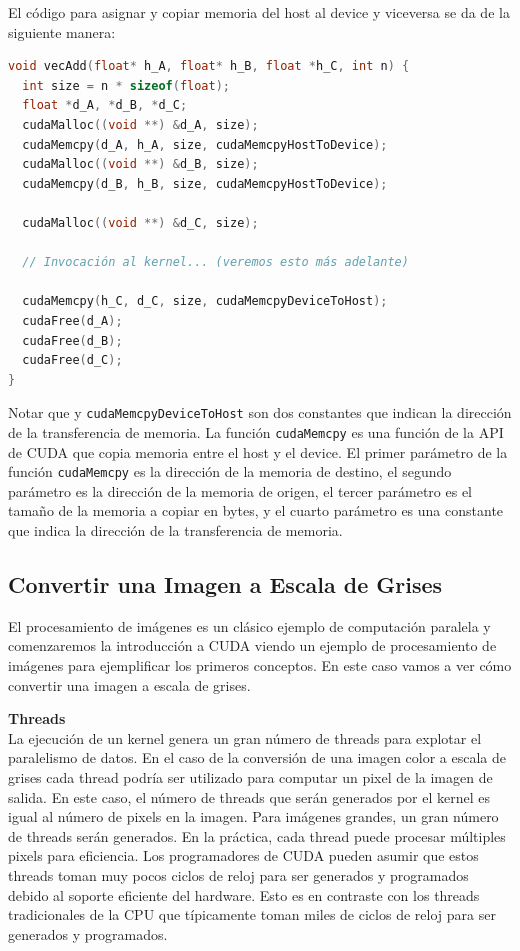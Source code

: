 El código para asignar y copiar memoria del host al device y viceversa se da de la siguiente manera:

\begin{lstlisting}[language=C]
void vecAdd(float* h_A, float* h_B, float *h_C, int n) {
  int size = n * sizeof(float);
  float *d_A, *d_B, *d_C;
  cudaMalloc((void **) &d_A, size);
  cudaMemcpy(d_A, h_A, size, cudaMemcpyHostToDevice);
  cudaMalloc((void **) &d_B, size);
  cudaMemcpy(d_B, h_B, size, cudaMemcpyHostToDevice);

  cudaMalloc((void **) &d_C, size);

  // Invocación al kernel... (veremos esto más adelante)

  cudaMemcpy(h_C, d_C, size, cudaMemcpyDeviceToHost);
  cudaFree(d_A);
  cudaFree(d_B);
  cudaFree(d_C);
}
\end{lstlisting}

Notar que  y \texttt{cudaMemcpyDeviceToHost} son dos constantes que indican la dirección
de la transferencia de memoria. La función \texttt{cudaMemcpy} es una función de la API de CUDA que copia memoria entre
el host y el device. El primer parámetro de la función \texttt{cudaMemcpy} es la dirección de la memoria de destino, el
segundo parámetro es la dirección de la memoria de origen, el tercer parámetro es el tamaño de la memoria a copiar en
bytes, y el cuarto parámetro es una constante que indica la dirección de la transferencia de memoria.

\subsection{Convertir una Imagen a Escala de Grises}

El procesamiento de imágenes es un clásico ejemplo de computación paralela y comenzaremos la introducción a CUDA viendo
un ejemplo de procesamiento de imágenes para ejemplificar los primeros conceptos. En este caso vamos a ver cómo
convertir una imagen a escala de grises.

\begin{tcolorbox}[colback=yellow,colframe=yellow!75!black,arc=0pt,outer arc=0pt]
  \textbf{Threads} \\

  La ejecución de un kernel genera un gran número de threads para explotar el paralelismo de datos. En el caso de la
  conversión de una imagen color a escala de grises cada thread podría ser utilizado para computar un pixel de la imagen
  de salida. En este caso, el número de threads que serán generados por el kernel es igual al número de pixels en la
  imagen. Para imágenes grandes, un gran número de threads serán generados. En la práctica, cada thread puede procesar
  múltiples pixels para eficiencia. Los programadores de CUDA pueden asumir que estos threads toman muy pocos ciclos de
  reloj para ser generados y programados debido al soporte eficiente del hardware. Esto es en contraste con los threads
  tradicionales de la CPU que típicamente toman miles de ciclos de reloj para ser generados y programados.
\end{tcolorbox}

